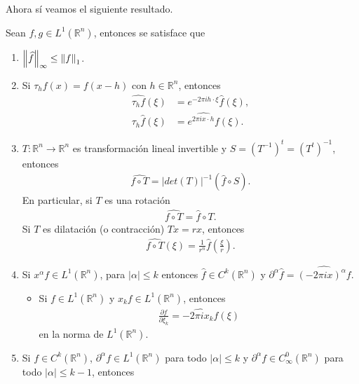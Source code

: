   Ahora sí veamos el siguiente resultado.
  \begin{theorem}{}
    Sean $f,g\in L^{1}(\mathbb{R}^{n})$, entonces se satisface que
    \begin{enumerate}
      \item $\left\lVert\widehat{f}\right\rVert_{\infty}\leq\left\lVert f\right\rVert_{1}$.
      \item Si $\tau_{h}f(x)=f(x-h)$ con $h\in\mathbb{R}^{n}$, entonces
        \begin{align*}
          \hat{\tau_{h}f}(\xi)&=e^{-2\pi ih\cdot \xi}\hat{f}(\xi),\\
          \tau_{h}\hat{f}(\xi)&=\hat{e^{2\pi ix\cdot h}f}(\xi).
        \end{align*}
      \item $T:\mathbb{R}^{n}\to\mathbb{R}^{n}$ es transformación lineal invertible y $S=\left( T^{-1} \right)^{t}=\left( T^{t} \right)^{-1}$, entonces
        \begin{align*}
          \hat{f\circ T}=|det(T)|^{-1}\left( \hat{f}\circ S \right).
        \end{align*}
        En particular, si $T$ es una rotación
        \begin{align*}
          \hat{f\circ T}=\hat{f}\circ T.
        \end{align*}
        Si $T$ es dilatación (o contracción) $Tx=rx$, entonces
        \begin{align*}
          \hat{f\circ T}(\xi)=\frac{1}{r^{n}}\hat{f}\left( \frac{\xi}{r} \right).
        \end{align*}
      \item Si $x^{\alpha}f\in L^{1}(\mathbb{R}^{n})$, para $|\alpha|\leq k$ entonces $\hat{f}\in C^{k}(\mathbb{R}^{n})$ y $\partial^{\alpha}\hat{f}=\hat{(-2\pi ix)^{\alpha}f}$.
      \begin{itemize}
        \item Si $f\in L^{1}(\mathbb{R}^{n})$ y $x_{k}f\in L^{1}(\mathbb{R}^{n})$, entonces 
          \begin{align*}
            \frac{\partial \hat{f}}{\partial \xi_k}=\hat{-2\pi ix_{k}f}(\xi)
          \end{align*}
          en la norma de $L^1(\mathbb{R}^{n})$.
      \end{itemize}
      \item Si $f\in C^{k}(\mathbb{R}^{n})$, $\partial^{\alpha}f\in L^{1}(\mathbb{R}^{n})$ para todo $|\alpha|\leq k$ y $\partial^{\alpha}f\in C^{0}_{\infty}(\mathbb{R}^{n})$ para todo $|\alpha|\leq k-1$, entonces
        \begin{align*}

\end{align*}
\end{enumerate}
\end{theorem}
